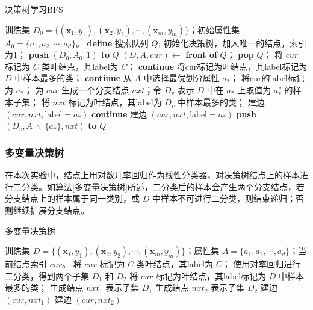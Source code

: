 \documentclass{ctexart}
\begin{document}
	\begin{algorithm}[!htb]
		\caption{决策树学习BFS}  
		\label{决策树学习BFS}
		\begin{algorithmic}[1]
			\Require  
			训练集 $D_0=\{(\bm{x}_1,y_1),(\bm{x}_2,y_2),\cdots,(\bm{x}_m,y_m)\}$；初始属性集 $A_0=\{a_1,a_2,\cdots,a_d\}$。
				\State \textbf{define} 搜索队列 $Q$;
				\State 初始化决策树，加入唯一的结点，索引为1；
				\State \textbf{push} $(D_0,A_0,1)$ \textbf{to} $Q$
					\State $(D,A,cur)\gets$ \textbf{front of} $Q$；
					\State \textbf{pop} $Q$；
						\State 将 $cur$ 标记为 $C$ 类叶结点，其label为 $C$；
						\textbf{continue}	
					\EndIf
						\State 将cur标记为叶结点，其label标记为 $D$ 中样本最多的类；
						\textbf{continue}
					\EndIf
					\State 从 $A$ 中选择最优划分属性 $a_\ast$；
					\State 将cur的label标记为 $a_\ast$；
						\State 为 $cur$ 生成一个分支结点 $nxt$；令 $D_v$ 表示 $D$ 中在 $a_\ast$ 上取值为 $a_\ast^v$ 的样本子集；
							\State 将 $nxt$ 标记为叶结点，其label为 $D_v$ 中样本最多的类；
							\State 建边 $(cur, nxt, \text{label}=a_\ast)$
							\textbf{continue}
						\Else
							\State 建边 $(cur, nxt, \text{label}=a_\ast)$
							\State \textbf{push} $(D_v,A\ \backslash\ \{a_\ast\}, nxt)$ \textbf{to} $Q$
						\EndIf
					\EndFor
				\EndWhile
			\EndFunction
		\end{algorithmic}  
	\end{algorithm}

	\subsubsection{多变量决策树}
	
	在本次实验中，结点上用对数几率回归作为线性分类器，对决策树结点上的样本进行二分类。如算法\ref{多变量决策树}所述，二分类后的样本会产生两个分支结点，若分支结点上的样本属于同一类别，或 $D$ 中样本不可进行二分类，则结束递归；否则继续扩展分支结点。
	
	\begin{algorithm}[!htb]
		\caption{多变量决策树}  
		\label{多变量决策树}
		\begin{algorithmic}[1]
			\Require  
			训练集 $D=\{(\bm{x}_1,y_1),(\bm{x}_2,y_2),\cdots,(\bm{x}_m,y_m)\}$；属性集 $A=\{a_1,a_2,\cdots,a_d\}$；当前结点索引 $cur$。
					\State 将 $cur$ 标记为 $C$ 类叶结点，其label为 $C$；
					\Return
				\EndIf
				\State 使用对率回归进行二分类，得到两个子集 $D_1$ 和 $D_2$
					\State 将 $cur$ 标记为叶结点，其label标记为 $D$ 中样本最多的类；
					\Return
				\EndIf
				\State 生成结点 $nxt_1$ 表示子集 $D_1$
				\State 生成结点 $nxt_2$ 表示子集 $D_2$
				\State 建边 $(cur,nxt_1)$
				\State 建边 $(cur,nxt_2)$
				\State{}
				\State{}
			\EndFunction
		\end{algorithmic}  
	\end{algorithm}
\end{document}
